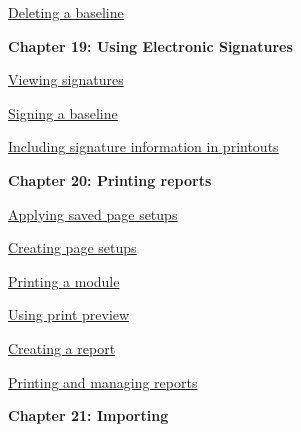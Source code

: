 \documentclass[11pt,a4paper]{article}
\begin{document}
\href{https://www.ibm.com/support/knowledgecenter/search/Deleting%20a%20baseline?scope=SSYQBZ_9.6.1}{Deleting a baseline} \\



\begin{Large}\textbf{Chapter 19: Using Electronic Signatures} \end{Large} 
\vspace{1mm}

\href{https://www.ibm.com/support/knowledgecenter/search/Viewing%20signatures?scope=SSYQBZ_9.6.1}{Viewing signatures}

\href{https://www.ibm.com/support/knowledgecenter/search/Signing%20a%20baseline?scope=SSYQBZ_9.6.1}{Signing a baseline}

\href{https://www.ibm.com/support/knowledgecenter/search/Including%20signature%20information%20in%20printouts?scope=SSYQBZ_9.6.1}{Including signature information in printouts} \\



\begin{Large}\textbf{Chapter 20: Printing reports} \end{Large} 
\vspace{1mm}

\href{https://www.ibm.com/support/knowledgecenter/search/Applying%20saved%20page%20setups?scope=SSYQBZ_9.6.1}{Applying saved page setups}

\href{https://www.ibm.com/support/knowledgecenter/search/Creating%20page%20setups?scope=SSYQBZ_9.6.1}{Creating page setups}

\href{https://www.ibm.com/support/knowledgecenter/search/Printing%20a%20module?scope=SSYQBZ_9.6.1}{Printing a module}

\href{https://www.ibm.com/support/knowledgecenter/search/Using%20print%20preview?scope=SSYQBZ_9.6.1}{Using print preview}

\href{https://www.ibm.com/support/knowledgecenter/search/Creating%20a%20report?scope=SSYQBZ_9.6.1}{Creating a report}

\href{https://www.ibm.com/support/knowledgecenter/search/Printing%20and%20managing%20reports?scope=SSYQBZ_9.6.1}{Printing and managing reports} \\


\newpage

\begin{Large}\textbf{Chapter 21: Importing} \end{Large} 
\vspace{1mm}
\end{document}
